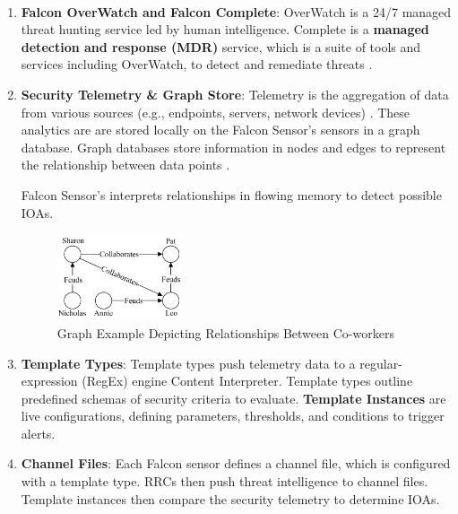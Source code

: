 \begin{enumerate}
    \item \textbf{Falcon OverWatch\textsuperscript{\textregistered} and Falcon Complete\textsuperscript{\texttrademark}}: OverWatch is a 24/7 managed threat hunting service led by human
          intelligence. Complete is a \textbf{managed detection and response (MDR)} service, which is a suite of tools and services including OverWatch, to detect and remediate threats
          \cite{cosive_falcon_complete}\cite{crowdstrike_falcon_complete}\cite{crowdstrike_overwatch}.

    \item \textbf{Security Telemetry \& Graph Store}: Telemetry is the aggregation of data from various sources (e.g., endpoints, servers, network devices) \cite{proofpoint_telemetry}. These analytics are
          are stored locally on the Falcon Sensor's sensors in a graph database. Graph databases store information in nodes and edges to represent
          the relationship between data points \cite{oracle_graph_database}.

          \newpage
          Falcon Sensor's interprets relationships in flowing memory to detect possible IOAs.\\
          \begin{figure}[h!]
              \vspace{-1em}
              \centering
              \includegraphics[width=0.35\textwidth]{Sections/crowd/graph.png}
              \caption{Graph Example Depicting Relationships Between Co-workers}
              \label{fig:graphdb}

              \vspace{-1em}
          \end{figure}

    \item \textbf{Template Types}: Template types push telemetry data to a regular-expression (RegEx) engine
          Content Interpreter. Template types outline predefined schemas of security criteria to evaluate. \textbf{Template Instances}
          are live configurations, defining parameters, thresholds, and conditions to trigger alerts.
    \item \textbf{Channel Files}: Each Falcon sensor defines a channel file, which is configured with a
          template type. RRCs then push threat intelligence to channel files. Template instances then compare the security telemetry to
          determine IOAs.



\end{enumerate}
